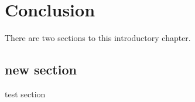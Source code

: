 \chapter{Conclusion}
There are two sections to this introductory chapter.

\section{new section}

test section

